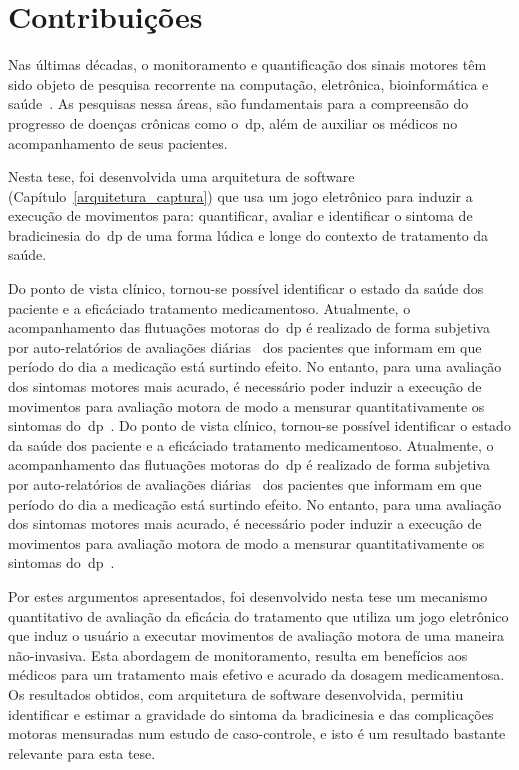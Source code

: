 \section{Contribuições}
Nas últimas décadas, o monitoramento e quantificação dos sinais motores têm sido objeto de pesquisa recorrente na computação, eletrônica, bioinformática e saúde~\cite{reviewassesenspark2015}. As pesquisas nessa áreas, são fundamentais para a compreensão do progresso de doenças crônicas como o~\ac{dp}, além de auxiliar os médicos no acompanhamento de seus pacientes.

Nesta tese, foi desenvolvida uma arquitetura de software (Capítulo~\ref{arquitetura_captura}) que usa um jogo eletrônico para induzir a execução de movimentos para: quantificar, avaliar e identificar o sintoma de bradicinesia do~\ac{dp} de uma forma lúdica e longe do contexto de tratamento da saúde.

Do ponto de vista clínico, tornou-se possível identificar o estado da saúde dos paciente e a eficáciado tratamento medicamentoso. Atualmente, o acompanhamento das flutuações motoras do~\ac{dp} é realizado de forma subjetiva por auto-relatórios de avaliações diárias~\cite{parkself2015,reviewassesenspark2015} dos pacientes que informam em que período do dia a medicação está surtindo efeito. No entanto, para uma avaliação dos sintomas motores mais acurado, é necessário poder induzir a execução de movimentos para avaliação motora de modo a mensurar quantitativamente os sintomas do~\ac{dp}~\cite{wiiassesspark2016}.
Do ponto de vista clínico, tornou-se possível identificar o estado da saúde dos paciente e a eficáciado tratamento medicamentoso. Atualmente, o acompanhamento das flutuações motoras do~\ac{dp} é realizado de forma subjetiva por auto-relatórios de avaliações diárias~\cite{parkself2015,reviewassesenspark2015} dos pacientes que informam em que período do dia a medicação está surtindo efeito. No entanto, para uma avaliação dos sintomas motores mais acurado, é necessário poder induzir a execução de movimentos para avaliação motora de modo a mensurar quantitativamente os sintomas do~\ac{dp}~\cite{wiiassesspark2016}.

Por estes argumentos apresentados, foi desenvolvido nesta tese um mecanismo quantitativo de avaliação da eficácia do tratamento que utiliza um jogo eletrônico que induz o usuário a executar movimentos de avaliação motora de uma maneira não-invasiva. Esta abordagem de monitoramento, resulta em benefícios aos médicos para um tratamento mais efetivo e acurado da dosagem medicamentosa. Os resultados obtidos, com arquitetura de software desenvolvida, permitiu identificar e estimar a gravidade do sintoma da bradicinesia e das complicações motoras mensuradas num estudo de caso-controle, e isto é um resultado bastante relevante para esta tese.

